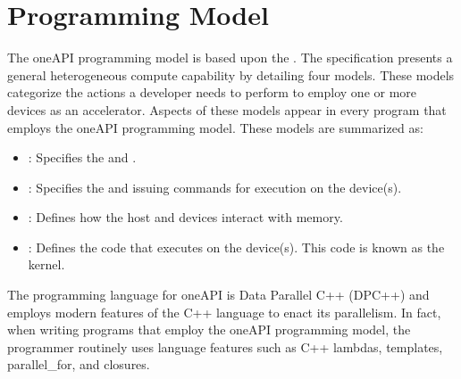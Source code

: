 \documentclass[letterpaper,10pt,english]{sphinxmanual}
\begin{document}
\chapter{Programming Model}
\label{\detokenize{programming-model/index:programming-model}}\label{\detokenize{programming-model/index:oneapi-programming-model}}\label{\detokenize{programming-model/index::doc}}
The oneAPI programming model is based upon the .
The specification presents a general heterogeneous compute capability by
detailing four models. These models categorize the actions a developer
needs to perform to employ one or more devices as an accelerator.
Aspects of these models appear in every program that employs the oneAPI
programming model. These models are summarized as:
\begin{itemize}
\item {} 
{\hyperref[\detokenize{programming-model/platform-model:platform-model}]{}}: Specifies the {\hyperref[\detokenize{glossary:term-host}]{}} and {\hyperref[\detokenize{glossary:term-device}]{}}.

\item {} 
{\hyperref[\detokenize{programming-model/execution-model:execution-model}]{}}: Specifies the {\hyperref[\detokenize{glossary:term-command-queue}]{}} and
issuing commands for execution on the device(s).

\item {} 
{\hyperref[\detokenize{programming-model/memory-model:memory-model}]{}}: Defines how the host and devices interact with
memory.

\item {} 
{\hyperref[\detokenize{programming-model/kernel-programming-model:kernel-programming-model}]{}}: Defines the code that executes on
the device(s). This code is known as the kernel.

\end{itemize}

The programming language for oneAPI is Data Parallel C++ (DPC++) and
employs modern features of the C++ language to enact its parallelism. In
fact, when writing programs that employ the oneAPI programming model,
the programmer routinely uses language features such as C++ lambdas,
templates, parallel\_for, and closures.
\end{document}
